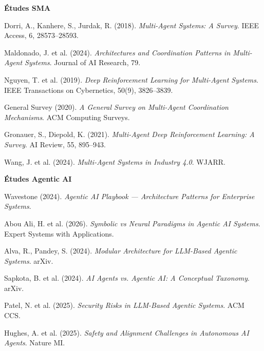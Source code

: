 \documentclass[12pt,a4paper]{report}
\begin{document}
\begin{description}[leftmargin=0pt, itemsep=4pt]

\item \textbf{Études SMA}

\item Dorri, A., Kanhere, S., Jurdak, R. (2018). \textit{Multi-Agent Systems: A Survey}. IEEE Access, 6, 28573--28593.

\item Maldonado, J. et al. (2024). \textit{Architectures and Coordination Patterns in Multi-Agent Systems}. Journal of AI Research, 79.

\item Nguyen, T. et al. (2019). \textit{Deep Reinforcement Learning for Multi-Agent Systems}. IEEE Transactions on Cybernetics, 50(9), 3826--3839.

\item General Survey (2020). \textit{A General Survey on Multi-Agent Coordination Mechanisms}. ACM Computing Surveys.

\item Gronauer, S., Diepold, K. (2021). \textit{Multi-Agent Deep Reinforcement Learning: A Survey}. AI Review, 55, 895--943.

\item Wang, J. et al. (2024). \textit{Multi-Agent Systems in Industry 4.0}. WJARR.

\medskip
\item \textbf{Études Agentic AI}

\item Wavestone (2024). \textit{Agentic AI Playbook --- Architecture Patterns for Enterprise Systems}.

\item Abou Ali, H. et al. (2026). \textit{Symbolic vs Neural Paradigms in Agentic AI Systems}. Expert Systems with Applications.

\item Alva, R., Pandey, S. (2024). \textit{Modular Architecture for LLM-Based Agentic Systems}. arXiv.

\item Sapkota, B. et al. (2024). \textit{AI Agents vs. Agentic AI: A Conceptual Taxonomy}. arXiv.

\item Patel, N. et al. (2025). \textit{Security Risks in LLM-Based Agentic Systems}. ACM CCS.

\item Hughes, A. et al. (2025). \textit{Safety and Alignment Challenges in Autonomous AI Agents}. Nature MI.


\end{description}
\end{document}
